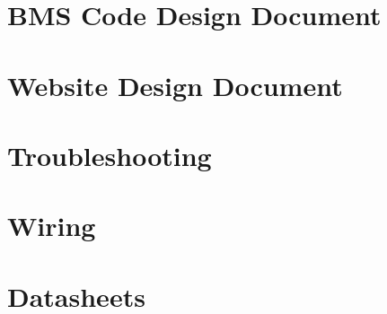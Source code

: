 \documentclass[a4paper,12pt]{report}
\begin{document}
\chapter{BMS Code Design Document}


\chapter{Website Design Document}


\chapter{Troubleshooting}


\chapter{Wiring}


\chapter{Datasheets}



\printbibliography
\end{document}
